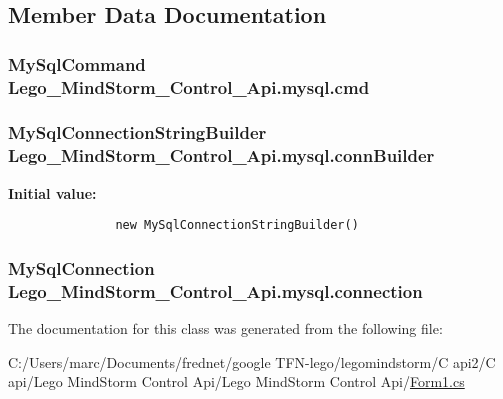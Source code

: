 \subsection{Member Data Documentation}
\hypertarget{class_lego___mind_storm___control___api_1_1mysql_c19dd7025d5e2e077c5b1d5085a44d32}{
\subsubsection[{cmd}]{\setlength{\rightskip}{0pt plus 5cm}MySqlCommand {\bf Lego\_\-MindStorm\_\-Control\_\-Api.mysql.cmd}}}
\label{class_lego___mind_storm___control___api_1_1mysql_c19dd7025d5e2e077c5b1d5085a44d32}


\hypertarget{class_lego___mind_storm___control___api_1_1mysql_aaba9d0e2a1876f660c668f20da90320}{
\subsubsection[{connBuilder}]{\setlength{\rightskip}{0pt plus 5cm}MySqlConnectionStringBuilder {\bf Lego\_\-MindStorm\_\-Control\_\-Api.mysql.connBuilder}}}
\label{class_lego___mind_storm___control___api_1_1mysql_aaba9d0e2a1876f660c668f20da90320}


\textbf{Initial value:}

\begin{Code}\begin{verbatim}
               new MySqlConnectionStringBuilder()
\end{verbatim}
\end{Code}
\hypertarget{class_lego___mind_storm___control___api_1_1mysql_71fe9f91ac2a14ef804254dab2937bf5}{
\subsubsection[{connection}]{\setlength{\rightskip}{0pt plus 5cm}MySqlConnection {\bf Lego\_\-MindStorm\_\-Control\_\-Api.mysql.connection}}}
\label{class_lego___mind_storm___control___api_1_1mysql_71fe9f91ac2a14ef804254dab2937bf5}




The documentation for this class was generated from the following file:\begin{CompactItemize}
\item 
C:/Users/marc/Documents/frednet/google TFN-lego/legomindstorm/C api2/C api/Lego MindStorm Control Api/Lego MindStorm Control Api/\hyperlink{_form1_8cs}{Form1.cs}\end{CompactItemize}

